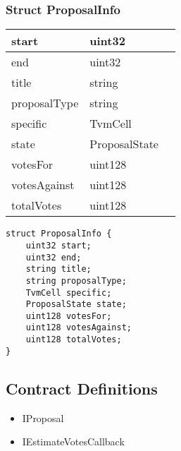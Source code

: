 \subsubsection{Struct ProposalInfo}


\ifsoltables
\noindent\begin{tabular}{|l|l|p{6cm}|}\hline
start & uint32 & \\\hline
end & uint32 & \\\hline
title & string & \\\hline
proposalType & string & \\\hline
specific & TvmCell & \\\hline
state & ProposalState & \\\hline
votesFor & uint128 & \\\hline
votesAgainst & uint128 & \\\hline
totalVotes & uint128 & \\\hline
\end{tabular}
\fi


\begin{lstlisting}[firstnumber=15]
struct ProposalInfo {
    uint32 start;
    uint32 end;
    string title;
    string proposalType;
    TvmCell specific;
    ProposalState state;
    uint128 votesFor;
    uint128 votesAgainst;
    uint128 totalVotes;
}
\end{lstlisting}

\subsection{Contract Definitions}

\begin{itemize}
\item IProposal
\item IEstimateVotesCallback
\end{itemize}
